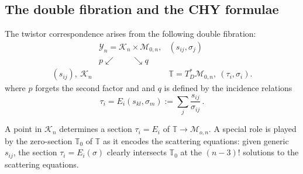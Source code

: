 \documentclass[11pt]{article}
\newcommand{\R}{\mathbb{R}}
\newcommand{\T}{\mathbb{T}}
\newcommand{\cK}{\mathcal{K}}
\newcommand{\cM}{\mathcal{M}}
\newcommand{\cY}{\mathcal{Y}}
\newcommand{\1}{{\rm 1\hskip-0.25em I}}
\begin{document}

\subsection{The double fibration and the CHY formulae}
The twistor correspondence  arises from the following double fibration:
\begin{eqnarray}
~& \cY_n=\cK_n\times \cM_{0,n},&(s_{ij},\sigma_j)\nonumber\\
&p\swarrow\qquad\searrow q&\nonumber\\
(s_{ij}),~ \cK_n&&\T= T^*_D \cM_{0,n}, ~ (\tau_i,\sigma_i) . 
\end{eqnarray}
where $p$ forgets the second factor and and
$q$ is defined by  the incidence relations
\begin{equation}
\tau_i =E_i(s_{kl}, \sigma_m):=\sum_j \frac{s_{ij}}{\sigma_{ij}}\, . \label{incidence}
\end{equation}

A point in $\cK_n$ determines a section $\tau_i=E_i$ of $\T\rightarrow \cM_{o,n}$. A special role is played by the zero-section $\T_0$ of $\T$ as it encodes the scattering equations: given generic $s_{ij}$, the section $\tau_i=E_i(\sigma)$ clearly intersects $\T_0$ at the $(n-3)!$ solutions to the scattering equations.
\end{document}
